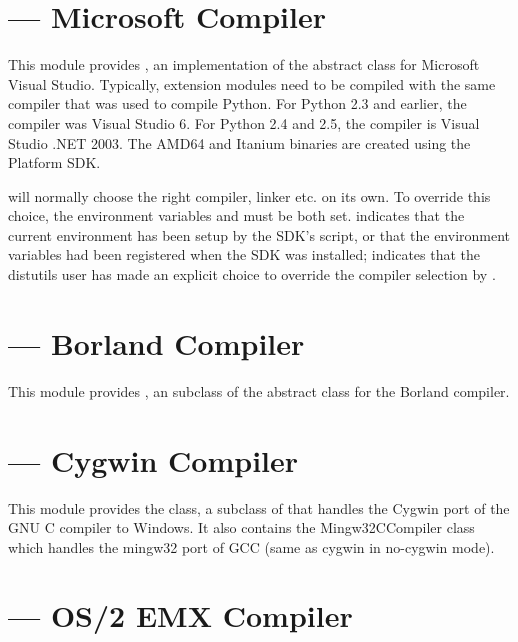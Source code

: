 \documentclass{manual}
\begin{document}
\section{ --- Microsoft Compiler}

This module provides , an implementation of the abstract 
 class for Microsoft Visual Studio. Typically, extension
modules need to be compiled with the same compiler that was used to compile
Python. For Python 2.3 and earlier, the compiler was Visual Studio 6. For
Python 2.4 and 2.5, the compiler is Visual Studio .NET 2003. The AMD64
and Itanium binaries are created using the Platform SDK.

 will normally choose the right compiler, linker etc.
on its own. To override this choice, the environment variables
 and  must be both set. 
indicates that the current environment has been setup by the SDK's
 script, or that the environment variables had been
registered when the SDK was installed;  indicates
that the distutils user has made an explicit choice to override the
compiler selection by .

\section{ --- Borland Compiler}
This module provides , an subclass of the abstract  class for the Borland \Cpp{} compiler.

\section{ --- Cygwin Compiler}

This module provides the  class, a subclass of  that
handles the Cygwin port of the GNU C compiler to Windows.  It also contains
the Mingw32CCompiler class which handles the mingw32 port of GCC (same as
cygwin in no-cygwin mode).

\section{ --- OS/2 EMX Compiler}
\end{document}
